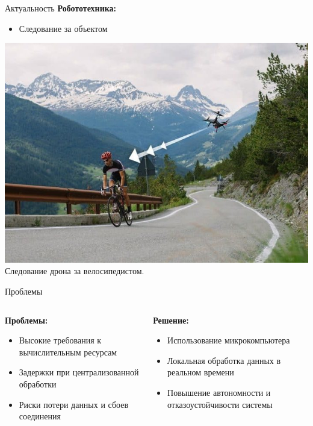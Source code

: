 \documentclass{beamer} %
\begin{document}
\begin{frame}{Актуальность}
  \textbf{Робототехника:}
  \begin{itemize}
    \item Следование за объектом
  \end{itemize}
  \vspace{0.5cm}
  \centering
  \includegraphics[width=0.7\linewidth]{presentation/drone.jpg}\\
  \small Следование дрона за велосипедистом.
\end{frame}

\begin{frame}{Проблемы}
  \begin{columns}[T]
    \begin{column}{0.45\textwidth}
      \textbf{Проблемы:}
      \begin{itemize}
        \item Высокие требования к вычислительным ресурсам
        \item Задержки при централизованной обработки
        \item Риски потери данных и сбоев соединения
      \end{itemize}
    \end{column}
    \begin{column}{0.45\textwidth}
      \textbf{Решение:}
      \begin{itemize}
        \item Использование микрокомпьютера
        \item Локальная обработка данных в реальном времени
        \item Повышение автономности и отказоустойчивости системы
      \end{itemize}
    \end{column}
  \end{columns}
\end{frame}
\end{document}
